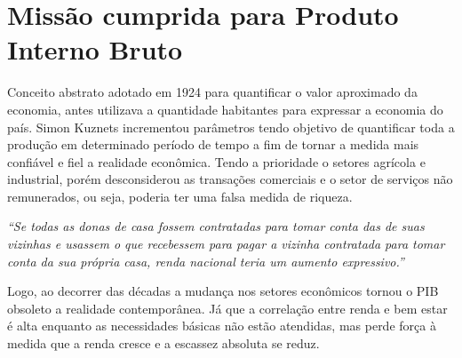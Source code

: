 \section{Missão cumprida para Produto Interno Bruto}

Conceito abstrato adotado em 1924 para quantificar o valor aproximado da economia, antes utilizava a quantidade habitantes para expressar a economia do país. 
Simon Kuznets incrementou parâmetros tendo objetivo de quantificar toda a produção em determinado período de tempo a fim de tornar a medida mais confiável e fiel a realidade econômica.
Tendo a prioridade o setores agrícola e industrial, porém desconsiderou as transações comerciais e o setor de serviços não remunerados, ou seja, poderia ter uma falsa medida de riqueza.

\begin{citacao}
    \textit{``Se todas as donas de casa fossem contratadas para tomar conta das de suas vizinhas e usassem o que recebessem para pagar a vizinha contratada para tomar conta da sua própria casa, renda nacional teria um aumento expressivo.'' } 
    \begin{flushright}
    \end{flushright}
\end{citacao}   

Logo, ao decorrer das décadas a mudança nos setores econômicos tornou o PIB obsoleto a realidade contemporânea. 
Já que a correlação entre renda e bem estar é alta enquanto as necessidades básicas não estão atendidas, mas perde força à medida que a renda cresce e a escassez absoluta se reduz.
